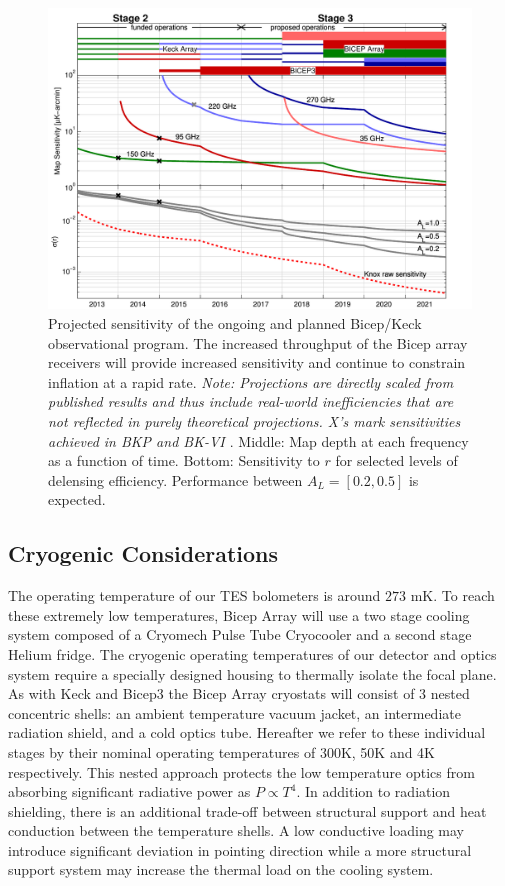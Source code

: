 \documentclass[12pt]{article}
\begin{document}
\begin{figure}[ht]
	\center
	\includegraphics[width=.6\textwidth]{bk_projections.pdf}
	\caption{Projected sensitivity of the ongoing and planned Bicep/Keck
	observational program. The increased throughput of the Bicep array
	receivers will provide increased sensitivity and continue to constrain
	inflation at a rapid rate. \textit{Note: Projections are directly scaled
	from published results and thus include real-world inefficiencies that are
	not reflected in purely theoretical projections. X's mark sensitivities
	achieved in BKP and BK-VI \cite{BK6, cite:BKP}}. Middle: Map depth at each
	frequency as a function of time. Bottom: Sensitivity to $r$ for selected
	levels of delensing efficiency. Performance between $A_L = [0.2, 0.5]$ is
	expected.}
	\label{fig:projections}
\end{figure}


\subsection{Cryogenic Considerations}
The operating temperature of our TES bolometers is around $273$ mK. To reach
these extremely low temperatures, Bicep Array will use a two stage cooling
system composed of a Cryomech Pulse Tube Cryocooler and a second stage Helium
fridge. The cryogenic operating temperatures of our detector and optics
system require a specially designed housing to thermally isolate the focal
plane. As with Keck and Bicep3 the Bicep Array cryostats will consist of 3
nested concentric shells: an ambient temperature vacuum jacket, an
intermediate radiation shield, and a cold optics tube. Hereafter we refer to
these individual stages by their nominal operating temperatures of 300K, 50K
and 4K respectively. This nested approach protects the low temperature optics
from absorbing significant radiative power as $P\propto T^4$.  In addition to
radiation shielding, there is an additional trade-off between structural
support and heat conduction between the temperature shells. A low conductive
loading may introduce significant deviation in pointing direction while a more
structural support system may increase the thermal load on the cooling system. 
\end{document}
